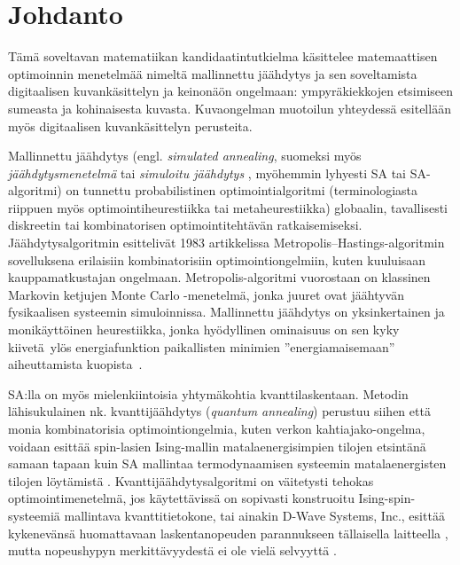 \chapter{Johdanto}
\label{cha:johdanto}


Tämä soveltavan matematiikan kandidaatintutkielma käsittelee matemaattisen optimoinnin menetelmää nimeltä mallinnettu jäähdytys ja sen soveltamista digitaalisen kuvankäsittelyn ja keinonäön ongelmaan: ympyräkiekkojen etsimiseen sumeasta ja kohinaisesta kuvasta.
Kuvaongelman muotoilun yhteydessä esitellään myös digitaalisen kuvankäsittelyn perusteita.

Mallinnettu jäähdytys (engl. \emph{simulated annealing}, suomeksi myös \emph{jäähdytysmenetelmä} tai \emph{simuloitu jäähdytys} \cite[suomennokset ks.][]{haataja93}, myöhemmin lyhyesti SA tai SA-algoritmi) on tunnettu probabilistinen optimointialgoritmi (terminologiasta riippuen myös optimointiheurestiikka tai metaheurestiikka) globaalin, tavallisesti diskreetin tai kombinatorisen optimointitehtävän ratkaisemiseksi.
Jäähdytysalgoritmin esittelivät \citeauthor*{kirkpatrick83} 1983 artikkelissa \cite{kirkpatrick83} Metropolis--Hastings-algoritmin sovelluksena erilaisiin kombinatorisiin optimointiongelmiin, kuten kuuluisaan kauppamatkustajan ongelmaan.
Metropolis-algoritmi vuorostaan on klassinen Markovin ketjujen Monte Carlo -menetelmä, jonka juuret ovat jäähtyvän fysikaalisen systeemin simuloinnissa.
Mallinnettu jäähdytys on yksinkertainen ja monikäyttöinen heurestiikka,
jonka hyödyllinen ominaisuus on sen kyky kiivetä ylös energiafunktion paikallisten minimien ''energiamaisemaan'' aiheuttamista kuopista~\cite{salamonetal}.

SA:lla on myös mielenkiintoisia yhtymäkohtia kvanttilaskentaan.
Metodin lähisukulainen nk. kvanttijäähdytys (\emph{quantum annealing}) perustuu siihen että monia kombinatorisia optimointiongelmia,
kuten verkon kahtiajako-ongelma, voidaan esittää spin-lasien Ising-mallin matalaenergisimpien tilojen etsintänä samaan tapaan kuin SA mallintaa termodynaamisen systeemin matalaenergisten tilojen löytämistä \cites[luku 4.5]{laarhoven}[]{johnson11dwave}.
Kvanttijäähdytysalgoritmi on väitetysti tehokas optimointimenetelmä, jos käytettävissä on sopivasti konstruoitu Ising-spin-systeemiä mallintava kvanttitietokone,
tai ainakin D-Wave Systems, Inc., esittää kykenevänsä huomattavaan laskentanopeuden parannukseen tällaisella laitteella \cite{johnson11dwave, denchev2015},
mutta nopeushypyn merkittävyydestä ei ole vielä selvyyttä \cite{troyer2015}.

